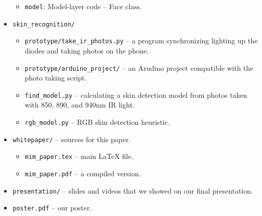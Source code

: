 \begin{itemize}
\begin{itemize}
            \item \texttt{model}: Model-layer code -- Face class.
        \end{itemize}
        \item \texttt{skin\_recognition/}
        \begin{itemize}
            \item \texttt{prototype/take\_ir\_photos.py} -- a program synchronizing
                  lighting up the diodes and taking photos on the phone.
            \item \texttt{prototype/arduino\_project/} -- an Arudino project
                  compatible with the photo taking script.
            \item \texttt{find\_model.py} -- calculating a skin detection model from
                  photos taken with 850, 890, and 940nm IR light.
            \item \texttt{rgb\_model.py} -- RGB skin detection heuristic.
        \end{itemize}
        \item \texttt{whitepaper/} -- sources for this paper.
        \begin{itemize}
            \item \texttt{mim\_paper.tex} -- main LaTeX file.
            \item \texttt{mim\_paper.pdf} -- a compiled version.
        \end{itemize}
        \item \texttt{presentation/} -- slides and videos that we showed on our
              final presentation.
        \item \texttt{poster.pdf} -- our poster.
    \end{itemize}
